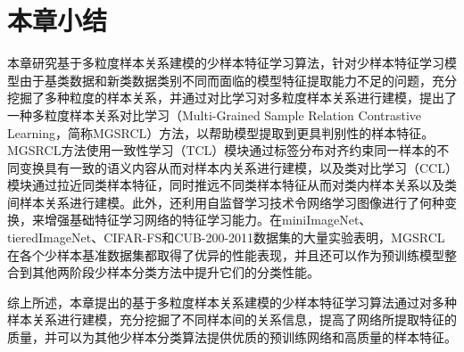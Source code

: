 \section[\hspace{-2pt}本章小结]{{\heiti{} \hspace{-8pt}本章小结}}\label{section3: 本章小结}

本章研究基于多粒度样本关系建模的少样本特征学习算法，针对少样本特征学习模型由于基类数据和新类数据类别不同而面临的模型特征提取能力不足的问题，充分挖掘了多种粒度的样本关系，并通过对比学习对多粒度样本关系进行建模，提出了一种多粒度样本关系对比学习（Multi-Grained Sample Relation Contrastive Learning，简称MGSRCL）方法，以帮助模型提取到更具判别性的样本特征。MGSRCL方法使用一致性学习（TCL）模块通过标签分布对齐约束同一样本的不同变换具有一致的语义内容从而对样本内关系进行建模，以及类对比学习（CCL）模块通过拉近同类样本特征，同时推远不同类样本特征从而对类内样本关系以及类间样本关系进行建模。此外，还利用自监督学习技术令网络学习图像进行了何种变换，来增强基础特征学习网络的特征学习能力。在miniImageNet、tieredImageNet、CIFAR-FS和CUB-200-2011数据集的大量实验表明，MGSRCL在各个少样本基准数据集都取得了优异的性能表现，并且还可以作为预训练模型整合到其他两阶段少样本分类方法中提升它们的分类性能。

综上所述，本章提出的基于多粒度样本关系建模的少样本特征学习算法通过对多种样本关系进行建模，充分挖掘了不同样本间的关系信息，提高了网络所提取特征的质量，并可以为其他少样本分类算法提供优质的预训练网络和高质量的样本特征。

